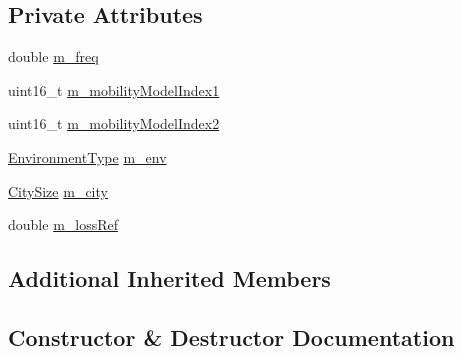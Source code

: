 \subsection*{Private Attributes}
\begin{DoxyCompactItemize}
\item 
double \hyperlink{classBuildingsPathlossTestCase_a90150f4e2d28b5efde2a48ac8c13d3fc}{m\+\_\+freq}
\item 
uint16\+\_\+t \hyperlink{classBuildingsPathlossTestCase_aeb1bf5997aa2b647fb373b242882278c}{m\+\_\+mobility\+Model\+Index1}
\item 
uint16\+\_\+t \hyperlink{classBuildingsPathlossTestCase_a414f4e3129ea9e835f67007bbb6134b0}{m\+\_\+mobility\+Model\+Index2}
\item 
\hyperlink{group__propagation_ga0e392ed771a28c92112047e63308a53a}{Environment\+Type} \hyperlink{classBuildingsPathlossTestCase_abaed00c46ac583663cb48d1ed202a3d8}{m\+\_\+env}
\item 
\hyperlink{group__propagation_ga29c9a1b1a58b6a56054ff5ea4c5a574d}{City\+Size} \hyperlink{classBuildingsPathlossTestCase_a7ad7c5b7a21683b8634de9509743150b}{m\+\_\+city}
\item 
double \hyperlink{classBuildingsPathlossTestCase_a4cde89661f690fa19bff2259ca7328bf}{m\+\_\+loss\+Ref}
\end{DoxyCompactItemize}
\subsection*{Additional Inherited Members}


\subsection{Constructor \& Destructor Documentation}
